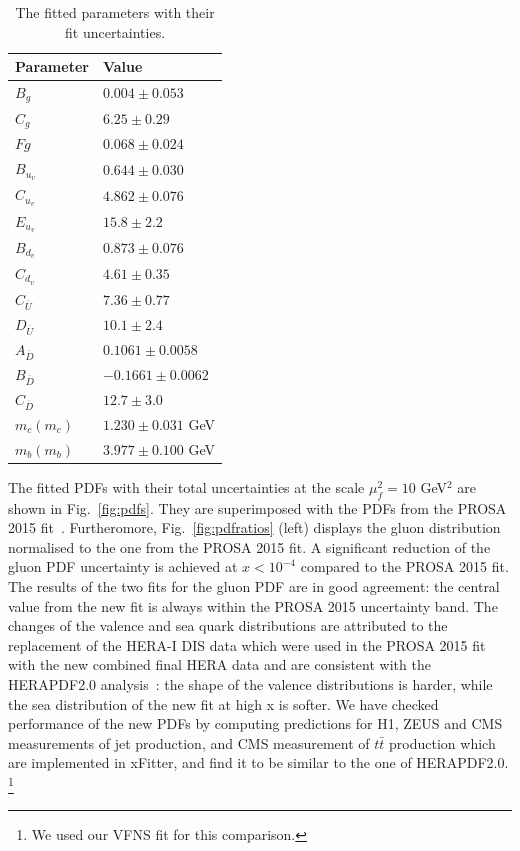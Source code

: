 \documentclass[12pt]{article}
\begin{document}
\begin{table}
    \renewcommand*{\arraystretch}{1.12}
    \centering
\begin{tabular}{ll}
    Parameter & Value \\
    \hline
    $B_g$ & $0.004 \pm 0.053$  \\
    $C_g$ & $6.25 \pm 0.29$  \\
    $Fg$ & $0.068 \pm 0.024$  \\
    $B_{u_v}$ & $0.644 \pm 0.030$  \\
    $C_{u_v}$ & $4.862 \pm 0.076$  \\
    $E_{u_v}$ & $15.8 \pm 2.2$  \\
    $B_{d_v}$ & $0.873 \pm 0.076$  \\
    $C_{d_v}$ & $4.61 \pm 0.35$  \\
    $C_{\overline{U}}$ & $7.36 \pm 0.77$  \\
    $D_{\overline{U}}$ & $10.1 \pm 2.4$  \\
    $A_{\overline{D}}$ & $0.1061 \pm 0.0058$  \\
    $B_{\overline{D}}$ & $-0.1661 \pm 0.0062$  \\
    $C_{\overline{D}}$ & $12.7 \pm 3.0$  \\
    $m_c(m_c)$ & $1.230 \pm 0.031$ GeV  \\
    $m_b(m_b)$ & $3.977 \pm 0.100$ GeV  \\
\end{tabular}
\caption{The fitted parameters with their fit uncertainties.}
\label{tab:pars}
\end{table}

The fitted PDFs with their total uncertainties at the scale $\mu^2_f=10$ GeV$^2$ are shown in Fig.~\ref{fig:pdfs}. They are superimposed with the PDFs from the PROSA 2015 fit~\cite{Zenaiev:2015rfa}. Furtheromore, Fig.~\ref{fig:pdfratios} (left) displays the gluon distribution normalised to the one from the PROSA 2015 fit. 
A significant reduction of the gluon PDF uncertainty is achieved at $x < 10^{-4}$ compared to the PROSA 2015 fit. 
The results of the two fits for the gluon PDF are in good agreement: the central value from the new fit is always within the PROSA 2015 uncertainty band. 
The changes of the valence and sea quark distributions are attributed to the replacement of the HERA-I DIS data which were used in the PROSA 2015 fit with the new combined final HERA data and are consistent with the HERAPDF2.0 analysis~\cite{Abramowicz:2015mha}: the shape of the valence distributions is harder, while the sea distribution of the new fit at high x is softer. 
We have checked performance of the new PDFs by computing predictions for H1, ZEUS and CMS measurements of jet production, and CMS measurement of $t\bar{t}$ production which are implemented in xFitter, and find it to be similar to the one of HERAPDF2.0.%
\footnote{We used our VFNS fit for this comparison.}
\end{document}
